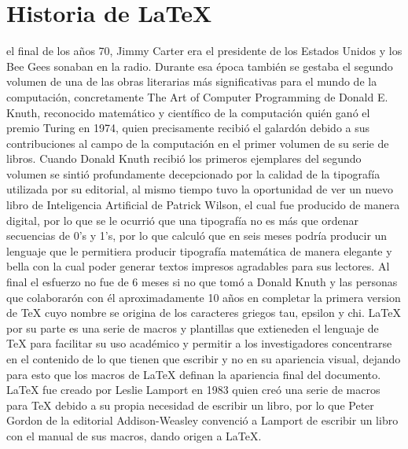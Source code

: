 \documentclass[journal]{IEEEtran}
\begin{document}
\section{Historia de \LaTeX}
% 
% 
% 
% 
 el final de los años 70, Jimmy Carter era el presidente de los Estados Unidos y los Bee Gees sonaban en la radio. Durante esa época también se gestaba el segundo volumen de  una de las obras literarias más significativas para el mundo de la computación, concretamente The Art of Computer Programming de Donald E. Knuth, reconocido matemático y científico de la computación quién ganó el premio Turing en 1974, quien precisamente recibió el galardón debido a sus contribuciones al campo de la computación en el primer volumen de su serie de libros.
Cuando Donald Knuth recibió los primeros ejemplares del segundo volumen se sintió profundamente decepcionado por la calidad de la tipografía utilizada por su editorial, al mismo tiempo tuvo la oportunidad de ver un nuevo libro de Inteligencia Artificial de Patrick Wilson, el cual fue producido de manera digital, por lo que se le ocurrió que una tipografía no es más que ordenar secuencias de 0’s y 1’s, por lo que calculó que en seis meses podría producir un lenguaje que le permitiera producir tipografía matemática de manera elegante y bella con la cual poder generar textos impresos agradables para sus lectores.
Al final el esfuerzo no fue de 6 meses si no que tomó a Donald Knuth y las personas que colaborarón con él aproximadamente 10 años en completar la primera version de TeX cuyo nombre se origina de los caracteres griegos tau, epsilon y chi\cite{ganguli_2013}.
LaTeX por su parte es una serie de macros y plantillas que extieneden el lenguaje de TeX para facilitar su uso académico y permitir a los investigadores concentrarse en el contenido de lo que tienen que escribir y no en su apariencia visual, dejando para esto que los macros de LaTeX definan la apariencia final del documento. LaTeX fue creado por Leslie Lamport en 1983 quien creó una serie de macros para TeX debido a su propia necesidad de escribir un libro, por lo que Peter Gordon de la editorial Addison-Weasley convenció a Lamport de escribir un libro con el manual de sus macros, dando origen a \LaTeX. \cite{lamport_1994}
\end{document}
